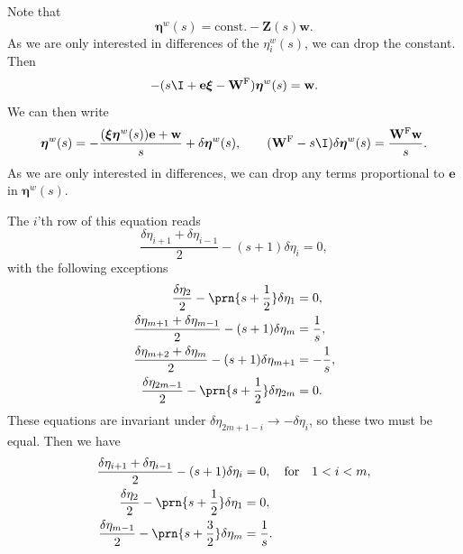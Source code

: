 \documentclass[12pt]{article}
\newcommand{\onev}{\mathbf{e}}
\newcommand{\fundm}{Z}
\newcommand{\fund}{\mathbf{\fundm}}
\newcommand{\arowm}{\xi}
\newcommand{\arow}{\boldsymbol{\arowm}}
\newcommand{\etwm}{\eta^w}
\newcommand{\etw}{\boldsymbol{\eta}^w}
\newcommand{\wm}{w}
\newcommand{\w}{\mathbf{\wm}}
\newcommand{\Wm}{W}
\newcommand{\W}{\mathbf{\Wm}}
\newcommand{\frg}{\W^{\mathrm{F}}}
\begin{document}
Note that
%
\begin{equation}\label{eq:etafund}
  \etw(s) = \text{const.} - \fund(s)\w.
\end{equation}
%
As we are only interested in differences of the \(\etwm_i(s)\), we can drop the constant.
Then
%
\begin{equation}\label{eq:etarecur}
  -(s\I + \onev \arow - \frg)\etw(s) = \w.
\end{equation}
%
We can then write
%
\begin{equation}\label{eq:detarecur}
  \etw(s) = -\frac{(\arow \etw(s)) \onev + \w}{s} + \delta \etw(s),
  \qquad
  (\frg - s\I) \delta \etw(s) = \frac{\frg \w}{s}.
\end{equation}
%
As we are only interested in differences, we can drop any terms proportional to \(\onev\) in \(\etw(s)\).

The \(i\)'th row of this equation reads
%
\begin{equation}\label{eq:detarow}
  \frac{\delta\eta_{i+1}+\delta\eta_{i-1}}{2} - (s+1)\delta\eta_i = 0,
\end{equation}
%
with the following exceptions
%
\begin{equation}\label{eq:detabnduni}
\begin{aligned}
  \frac{\delta\eta_2}{2} - \prn{s+\frac{1}{2}}\delta\eta_1 &= 0, \\
  \frac{\delta\eta_{m+1}+\delta\eta_{m-1}}{2} - (s+1)\delta\eta_{m} &= \frac{1}{s},\\
  \frac{\delta\eta_{m+2}+\delta\eta_{m}}{2} - (s+1)\delta\eta_{m+1} &= -\frac{1}{s},\\
  \frac{\delta\eta_{2m-1}}{2} - \prn{s+\frac{1}{2}}\delta\eta_{2m} &= 0.
\end{aligned}
\end{equation}
%
These equations are invariant under \(\delta\eta_{2m+1-i} \to -\delta\eta_i\), so these two must be equal.
Then we have
%
\begin{equation}\label{eq:detahalf}
\begin{aligned}
  \frac{\delta\eta_{i+1}+\delta\eta_{i-1}}{2} - (s+1)\delta\eta_i &= 0,
  \quad\text{for}\quad 1<i<m, \\
  \frac{\delta\eta_2}{2} - \prn{s+\frac{1}{2}}\delta\eta_1 &= 0, \\
  \frac{\delta\eta_{m-1}}{2} - \prn{s+\frac{3}{2}}\delta\eta_{m} &= \frac{1}{s}.
\end{aligned}
\end{equation}
%
\end{document}
